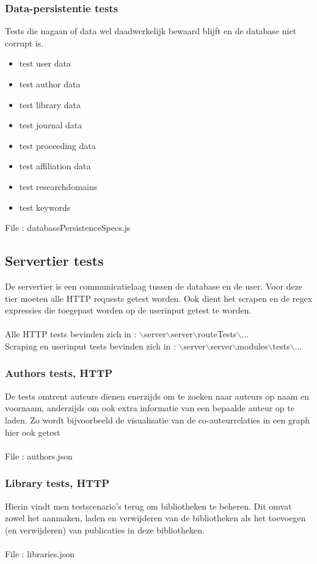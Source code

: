 \documentclass{article}
\begin{document}
\subsubsection{Data-persistentie tests}
Tests die nagaan of data wel daadwerkelijk bewaard blijft en de database niet corrupt is.
\begin{itemize}
\item test user data
\item test author data
\item test library data
\item test journal data
\item test proceeding data
\item test affiliation data
\item test researchdomains
\item test keywords
\end{itemize}
File : databasePersistenceSpecs.js
\subsection{Servertier tests}
De servertier is een communicatielaag tussen de database en de user. Voor deze tier moeten alle HTTP requests getest worden. Ook dient het scrapen en de regex expressies die toegepast worden op de userinput getest te worden. 
\\\\
Alle HTTP tests bevinden zich in : $\backslash$server$\backslash$server$\backslash$routeTests$\backslash$...\\
Scraping en userinput tests bevinden zich in : $\backslash$server$\backslash$server$\backslash$modules$\backslash$tests$\backslash$...
\subsubsection{Authors tests, HTTP}
De tests omtrent auteurs dienen enerzijds om te zoeken naar auteurs op naam en voornaam, anderzijds om ook extra informatie van een bepaalde auteur op te laden. Zo wordt bijvoorbeeld de visualisatie van de co-auteurrelaties in een graph hier ook getest\\\\
File : authors.json
\subsubsection{Library tests, HTTP}
Hierin vindt men testscenario's terug om bibliotheken te beheren. Dit omvat zowel het aanmaken, laden en verwijderen van de bibliotheken als het toevoegen (en verwijderen) van publicaties in deze bibliotheken.\\\\
File : libraries.json
\end{document}
